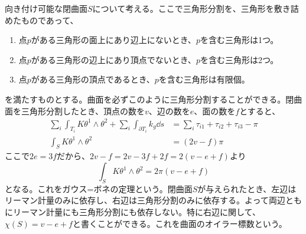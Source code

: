     向き付け可能な閉曲面$S$について考える。ここで三角形分割を、三角形を敷き詰めたものであって、
    \begin{enumerate}
        \item 点$p$がある三角形の面上にあり辺上にないとき、$p$を含む三角形は1つ。
        \item 点$p$がある三角形の辺上にあり頂点でないとき、$p$を含む三角形は2つ。
        \item 点$p$がある三角形の頂点であるとき、$p$を含む三角形は有限個。
    \end{enumerate}
    を満たすものとする。曲面を必ずこのように三角形分割することができる。閉曲面を三角形分割したとき、頂点の数を$v$、辺の数を$e$、面の数を$f$とすると、
    \begin{align*}
        \sum_i \int_{T_i} K\theta^1 \wedge \theta^2 + \sum_i \int_{\partial T_i} k_g \dd{s} &= \sum_i \tau_{i1} + \tau_{i2} + \tau_{i3} - \pi\\
        \int_S K\theta^1 \wedge \theta^2 &= (2v - f)\pi
    \end{align*}
    ここで$2e = 3f$だから、$2v - f = 2v - 3f + 2f = 2(v - e + f)$より
        \[\int_S K\theta^1 \wedge \theta^2 = 2\pi(v - e + f)\]
    となる。これをガウス=ボネの定理という。閉曲面$S$が与えられたとき、左辺はリーマン計量のみに依存し、右辺は三角形分割のみに依存する。よって両辺ともにリーマン計量にも三角形分割にも依存しない。特に右辺に関して、$\chi(S) = v - e + f$と書くことができる。これを曲面のオイラー標数という。